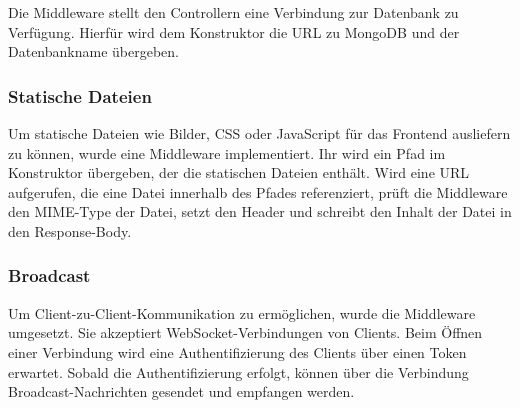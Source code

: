 Die Middleware  stellt den Controllern eine Verbindung zur
Datenbank zu Verfügung.  Hierfür wird dem Konstruktor die URL zu MongoDB und
der Datenbankname übergeben.

\subsubsection{Statische Dateien}
\label{sssec:bam_statische_dateien}

Um statische Dateien wie Bilder, CSS oder JavaScript für das Frontend
ausliefern zu können, wurde eine Middleware  implementiert.
Ihr wird ein Pfad im Konstruktor übergeben, der die statischen Dateien
enthält.  Wird eine URL aufgerufen, die eine Datei innerhalb des Pfades
referenziert, prüft die Middleware den MIME-Type der Datei, setzt den Header
 und schreibt den Inhalt der Datei in den Response-Body.

\subsubsection{Broadcast}
\label{sssec:bam_broadcast}

Um Client-zu-Client-Kommunikation zu ermöglichen, wurde die Middleware
 umgesetzt.  Sie akzeptiert WebSocket-Verbindungen von Clients.
Beim Öffnen einer Verbindung wird eine Authentifizierung des Clients über einen
Token erwartet.  Sobald die Authentifizierung erfolgt, können über die
Verbindung Broadcast-Nachrichten gesendet und empfangen werden.
